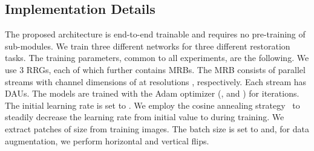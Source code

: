 \documentclass[runningheads]{llncs}
\begin{document}
\subsection{Implementation Details}
The proposed architecture is end-to-end trainable and requires no pre-training of sub-modules. 
We train three different networks for three different restoration tasks. The training parameters, common to all experiments, are the following. 
We use 3 RRGs, each of which further contains  MRBs. The MRB consists of  parallel streams with channel dimensions of  at resolutions , respectively. Each stream has  DAUs.  
The models are trained with the Adam optimizer (, and ) for  iterations. The initial learning rate is set to . We employ the cosine annealing strategy~\cite{loshchilov2016sgdr} to steadily decrease the learning rate from initial value to  during training. 
We extract patches of size  from training images. The batch size is set to  and, for data augmentation, we perform horizontal and vertical flips.  




\begin{table*}[t]
\begin{center}
\caption{\small Denoising comparisons on the SIDD dataset \cite{sidd}.}
\label{table:sidd}
\setlength{\tabcolsep}{2.5pt}
\end{center}\vspace{-2.5em}
\end{table*}
\end{document}
